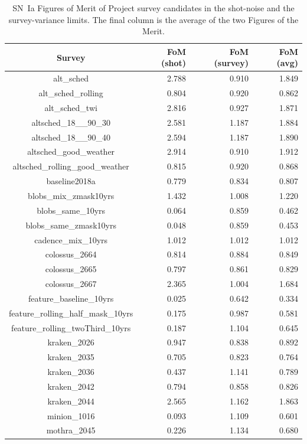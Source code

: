 \documentclass{aastex62}   	%
\begin{document}
\begin{table}
\caption{SN~Ia Figures of Merit of Project survey candidates
in  the shot-noise and the survey-variance limits.  The final column is the average
of the two Figures of the Merit.\label{table:ref}}
\centering
\begin{tabular}{|c|rrr|}
\hline
Survey & FoM (shot) & FoM (survey) & FoM (avg)\\
\hline
alt\_sched  & 2.788 & 0.910 & 1.849  \\
alt\_sched\_rolling  & 0.804 & 0.920 & 0.862  \\
alt\_sched\_twi  & 2.816 & 0.927 & 1.871  \\
altsched\_18\_\_90\_30  & 2.581 & 1.187 & 1.884  \\
altsched\_18\_\_90\_40  & 2.594 & 1.187 & 1.890  \\
altsched\_good\_weather  & 2.914 & 0.910 & 1.912  \\
altsched\_rolling\_good\_weather  & 0.815 & 0.920 & 0.868  \\
baseline2018a  & 0.779 & 0.834 & 0.807  \\
blobs\_mix\_zmask10yrs  & 1.432 & 1.008 & 1.220  \\
blobs\_same\_10yrs  & 0.064 & 0.859 & 0.462  \\
blobs\_same\_zmask10yrs  & 0.048 & 0.859 & 0.453  \\
cadence\_mix\_10yrs  & 1.012 & 1.012 & 1.012  \\
colossus\_2664  & 0.814 & 0.884 & 0.849  \\
colossus\_2665  & 0.797 & 0.861 & 0.829  \\
colossus\_2667  & 2.365 & 1.004 & 1.684  \\
feature\_baseline\_10yrs  & 0.025 & 0.642 & 0.334  \\
feature\_rolling\_half\_mask\_10yrs  & 0.175 & 0.987 & 0.581  \\
feature\_rolling\_twoThird\_10yrs  & 0.187 & 1.104 & 0.645  \\
kraken\_2026  & 0.947 & 0.838 & 0.892  \\
kraken\_2035  & 0.705 & 0.823 & 0.764  \\
kraken\_2036  & 0.437 & 1.141 & 0.789  \\
kraken\_2042  & 0.794 & 0.858 & 0.826  \\
kraken\_2044  & 2.565 & 1.162 & 1.863  \\
minion\_1016  & 0.093 & 1.109 & 0.601  \\
mothra\_2045  & 0.226 & 1.134 & 0.680  \\

\end{tabular}
\end{table}
\end{document}
